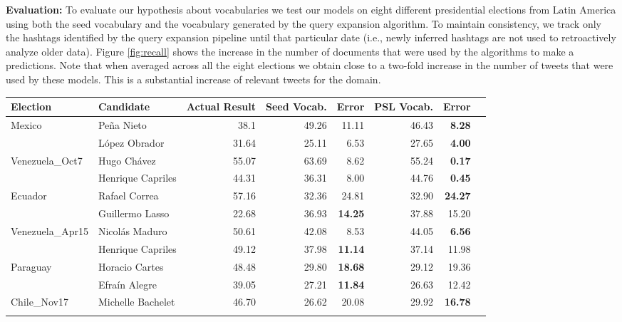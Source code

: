 \noindent
{\bf Evaluation:}
To evaluate our hypothesis about vocabularies we test our models on eight different presidential elections from Latin America using both the seed vocabulary and the vocabulary generated by the query expansion algorithm.
To maintain consistency, we track only the hashtags identified by 
the query expansion pipeline until that particular date (i.e., newly inferred hashtags are not used to
retroactively analyze older data).
Figure \ref{fig:recall} shows the increase in the number of documents that were used by the algorithms to make a predictions.
Note that when averaged across all the eight elections we obtain close to a two-fold increase in the number of 
tweets that were used by these models.
This is a substantial increase of relevant tweets for the domain.

	\begin{table*}
		\centering
		\begin{tabular}{| l | l | r | r | r | r | r | r |}
		\hline
		Election & Candidate & Actual Result & Seed Vocab. & Error & PSL Vocab. & Error \\
		\hline
		\multirow{2}{*}{Mexico} & Pe\~{n}a Nieto & 38.1 & 49.26 & 11.11 & 46.43 & \textbf{8.28} \\\cline{2-7}
											   & L\'{o}pez Obrador & 31.64 & 25.11 & 6.53 & 27.65 & \textbf{4.00} \\
		\hline
		\multirow{2}{*}{Venezuela\_Oct7} & Hugo Ch\'{a}vez & 55.07 & 63.69 & 8.62 & 55.24 & \textbf{0.17}\\\cline{2-7}
																& Henrique Capriles & 44.31 & 36.31 & 8.00 & 44.76 & \textbf{0.45} \\
		\hline
		\multirow{2}{*}{Ecuador} & Rafael Correa & 57.16 & 32.36 & 24.81 & 32.90 & \textbf{24.27} \\\cline{2-7}
												 & Guillermo Lasso & 22.68 & 36.93 & \textbf{14.25} & 37.88 & 15.20 \\
		\hline
		 \multirow{2}{*}{Venezuela\_Apr15} & Nicol\'{a}s Maduro & 50.61 & 42.08 & 8.53 & 44.05 & \textbf{6.56} \\\cline{2-7}
																	& Henrique Capriles & 49.12 & 37.98 & \textbf{11.14} & 37.14 & 11.98 \\
		\hline
		\multirow{2}{*}{Paraguay} & Horacio Cartes & 48.48 & 29.80 & \textbf{18.68} & 29.12 & 19.36 \\\cline{2-7}
												   & Efra\'{i}n Alegre & 39.05 & 27.21 & \textbf{11.84} & 26.63 & 12.42 \\
		\hline
		\multirow{2}{*}{Chile\_Nov17} & Michelle Bachelet & 46.70 & 26.62 & 20.08 & 29.92 & \textbf{16.78}\\\cline{2-7}

\end{tabular}
\end{table*}
